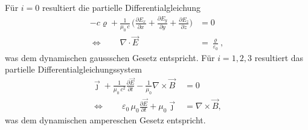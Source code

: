 Für $i=0$ resultiert die partielle Differentialgleichung
\begin{align}
-c\varrho + \frac{1}{\mu_0\,c}\,\biggl(\frac{\partial E_x}{\partial x}
+ \frac{\partial E_y}{\partial y} + \frac{\partial E_z}{\partial z}\biggr)
&=
0\\[1em]
\Leftrightarrow \qquad \nabla\cdot\vec{E}
&=
\frac{\varrho}{\varepsilon_0},
\label{maxwell:section:gauss_dynamisch}
\end{align}
was dem dynamischen gaussschen Gesetz entspricht.
Für $i=1,2,3$ resultiert das partielle Differentialgleichungssystem
\begin{align}
\vec{\jmath} + \frac{1}{\mu_0\,c^2}\frac{\partial \vec{E}}{\partial t}
- \frac{1}{\mu_0}\nabla\times\vec{B}
&=
0\\[1em]
\Leftrightarrow \qquad \varepsilon_0\,\mu_0\frac{\partial \vec{E}}{\partial t} + \mu_0\vec{\jmath}
&=
\nabla\times\vec{B},
\label{maxwell:section:ampere_dynamisch}
\end{align}
was dem dynamischen ampereschen Gesetz entspricht.


